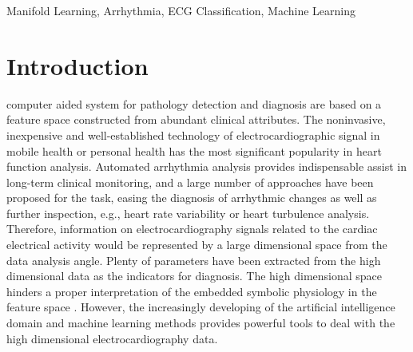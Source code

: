 \documentclass[journal]{IEEEtran}
\begin{document}
\begin{IEEEkeywords}
Manifold Learning, Arrhythmia, ECG Classification, Machine Learning
\end{IEEEkeywords}






%
\IEEEpeerreviewmaketitle



\section{Introduction}
% 
% 
% 
% 
 computer aided system for pathology detection and diagnosis are based on a feature space constructed from abundant clinical attributes.
The noninvasive, inexpensive and well-established technology of electrocardiographic signal in mobile health or personal health has the most significant popularity in heart function analysis. 
Automated arrhythmia analysis provides indispensable assist in long-term clinical monitoring, and a large number of approaches have been proposed for the task, easing the diagnosis of arrhythmic changes as well as further inspection, e.g., heart rate variability or heart turbulence analysis.
Therefore, information on electrocardiography signals related to the cardiac electrical activity would be represented by a large dimensional space from the data analysis angle.
Plenty of parameters have been extracted from the high dimensional data as the indicators for diagnosis. 
The high dimensional space hinders a proper interpretation of the embedded symbolic physiology in the feature space \cite{delgado2009dimensionality}.
However, the increasingly developing of the artificial intelligence domain and machine learning methods provides powerful tools to deal with the high dimensional electrocardiography data.
\end{document}
